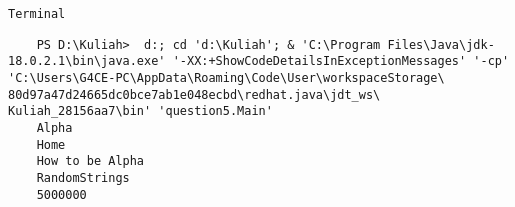 \documentclass[12pt,titlepage]{article}
\begin{document}
\texttt{Terminal}
\begin{verbatim}
    PS D:\Kuliah>  d:; cd 'd:\Kuliah'; & 'C:\Program Files\Java\jdk-18.0.2.1\bin\java.exe' '-XX:+ShowCodeDetailsInExceptionMessages' '-cp' 'C:\Users\G4CE-PC\AppData\Roaming\Code\User\workspaceStorage\ 80d97a47d24665dc0bce7ab1e048ecbd\redhat.java\jdt_ws\ Kuliah_28156aa7\bin' 'question5.Main' 
    Alpha
    Home
    How to be Alpha
    RandomStrings
    5000000
\end{verbatim}
\end{document}
